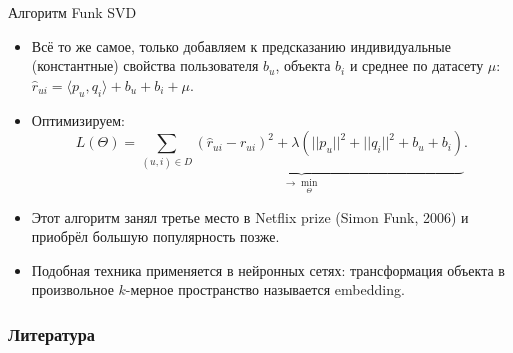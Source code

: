 \documentclass[9pt]{beamer}
\begin{document}
\begin{frame}{Алгоритм Funk SVD}
\begin{itemize}
    \item Всё то же самое, только добавляем к предсказанию индивидуальные (константные) свойства пользователя $b_u$, объекта $b_i$ и среднее по датасету $\mu$:
    $\hat r_{ui} = \langle p_u, q_i \rangle + b_u + b_i + \mu$.
    \item Оптимизируем:
$$L(\Theta) = \underbrace{\sum_{(u, i)\in D}(\hat r_{ui} - r_{ui})^2  + \lambda \left(||p_u||^2 + ||q_i||^2 + b_u + b_i \right)}_{\rightarrow \min_{\Theta}}.$$
    \item Этот алгоритм занял третье место в Netflix prize (Simon Funk, 2006) и приобрёл большую популярность позже.
    \item Подобная техника применяется в нейронных сетях: трансформация объекта в произвольное $k$-мерное пространство называется embedding.
\end{itemize}
\end{frame}

\begin{frame}[allowframebreaks]
    \frametitle{Литература}
    
    \nocite{rec_systems_cs_center}
    \nocite{rec_systems_habr}
    \nocite{koren_recommender}
    
\end{frame}
\end{document}
